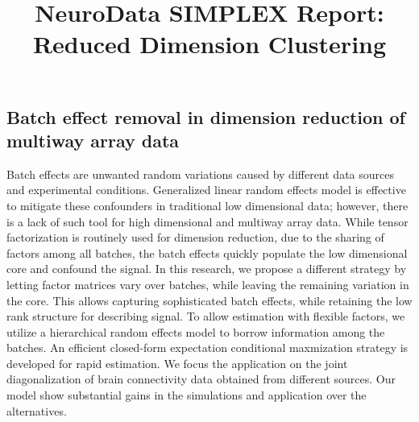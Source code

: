 \documentclass[simplex.tex]{subfiles}
\title{NeuroData SIMPLEX Report: Reduced Dimension Clustering}
\begin{document}

\subsection{Batch effect removal in dimension reduction of multiway array data}

Batch effects are unwanted random variations caused by different data sources and experimental conditions. Generalized linear random effects model is effective to mitigate these confounders in traditional low dimensional data; however, there is a lack of such tool for high dimensional and multiway array data. While tensor factorization is routinely used for dimension reduction, due to the sharing of factors among all batches, the batch effects quickly populate the low dimensional core and confound the signal. In this research, we propose a different strategy by letting factor matrices vary over batches, while leaving the remaining variation in the core. This allows capturing sophisticated batch effects, while retaining the low rank structure for describing signal. To allow estimation with flexible factors, we utilize a hierarchical random effects model to borrow information among the batches. An efficient closed-form expectation conditional maxmization strategy is developed for rapid estimation. We focus the application on the joint diagonalization of brain connectivity data obtained from different sources. Our model show substantial gains in the simulations and application over the alternatives.
\end{document}

